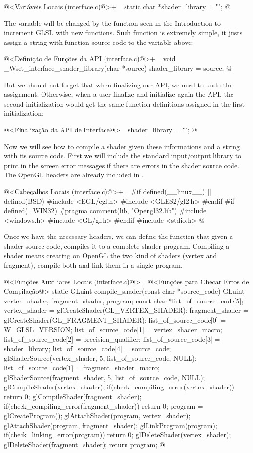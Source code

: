 \iniciocodigo
@<Variáveis Locais (interface.c)@>+=
static char *shader_library = "";
@
\fimcodigo

The variable will be changed by the function seen in the Introduction
to increment GLSL with new functions. Such function is extremely
simple, it justs assign a string with function source code to the
variable above:

\iniciocodigo
@<Definição de Funções da API (interface.c)@>+=
void _Wset_interface_shader_library(char *source){
  shader_library = source;
}
@
\fimcodigo

But we should not forget that when finalizing our API, we need to undo
the assignment. Otherwise, when a user finalize and initialize again
the API, the second initialization would get the same function
definitions assigned in the first initialization:

\iniciocodigo
@<Finalização da API de Interface@>=
shader_library = "";
@
\fimcodigo

Now we will see how to compile a shader given these informations and a
string with its source code. First we will include the standard
input/output library to print in the screen error messages if there
are errors in the shader source code. The OpenGL headers are already
included in .

\iniciocodigo
@<Cabeçalhos Locais (interface.c)@>+=
#if defined(__linux__) || defined(BSD)
#include <EGL/egl.h>
#include <GLES2/gl2.h>
#endif
#if defined(_WIN32)
#pragma comment(lib, "Opengl32.lib")
#include <windows.h>
#include <GL/gl.h>
#endif
#include <stdio.h>
@
\fimcodigo

Once we have the necessary headers, we can define the function that
given a shader source code, compiles it to a complete shader
program. Compiling a shader means creating on OpenGL the two kind of
shaders (vertex and fragment), compile both and link them in a
single program.

\iniciocodigo
@<Funções Auxiliares Locais (interface.c)@>=
@<Funções para Checar Erros de Compilação@>
static GLuint compile_shader(const char *source_code){
  GLuint vertex_shader, fragment_shader, program;
  const char *list_of_source_code[5];
  vertex_shader = glCreateShader(GL_VERTEX_SHADER);
  fragment_shader = glCreateShader(GL_FRAGMENT_SHADER);
  list_of_source_code[0] = W_GLSL_VERSION;
  list_of_source_code[1] = vertex_shader_macro;
  list_of_source_code[2] = precision_qualifier;
  list_of_source_code[3] = shader_library;
  list_of_source_code[4] = source_code;
  glShaderSource(vertex_shader, 5, list_of_source_code, NULL);
  list_of_source_code[1] = fragment_shader_macro;
  glShaderSource(fragment_shader, 5, list_of_source_code, NULL);
  glCompileShader(vertex_shader);
  if(check_compiling_error(vertex_shader))
    return 0;
  glCompileShader(fragment_shader);
  if(check_compiling_error(fragment_shader))
    return 0;
  program = glCreateProgram();
  glAttachShader(program, vertex_shader);
  glAttachShader(program, fragment_shader);
  glLinkProgram(program);
  if(check_linking_error(program))
    return 0;
  glDeleteShader(vertex_shader);
  glDeleteShader(fragment_shader);
  return program;
}
@
\fimcodigo

